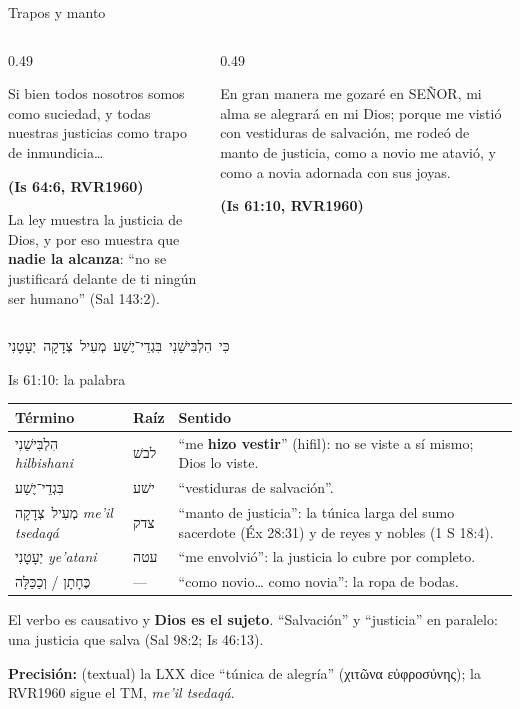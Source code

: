 \documentclass[hyperref={bookmarks=false},aspectratio=169]{beamer}
\newcommand{\heb}[1]{\mbox{\foreignlanguage{hebrew}{#1}}}
\newcommand{\grc}[1]{\foreignlanguage{ancientgreek}{#1}}
\newcommand{\SENOR}{S{\fontsize{0.78em}{1em}\selectfont EÑOR}}
\newcommand{\fuente}[1]{\par\hfill{\upshape\bfseries\footnotesize\textcolor{azul}{#1}}}
\newcommand{\destacar}[1]{\textbf{\textcolor{azul}{#1}}}
\newcommand{\precision}[1]{{\footnotesize\color{gris}\textbf{Precisión:} #1}}
\begin{document}
\begin{frame}{Trapos y manto}
\begin{columns}[t,onlytextwidth]
\begin{column}{0.49\textwidth}
\begin{cita}Si bien todos nosotros somos como suciedad, y todas nuestras justicias como trapo de inmundicia\ldots\fuente{(Is 64:6, RVR1960)}\end{cita}
\small La ley muestra la justicia de Dios, y por eso muestra que \destacar{nadie la alcanza}: ``no se justificará delante de ti ningún ser humano'' (Sal 143:2).
\end{column}
\begin{column}{0.49\textwidth}
\begin{cita}En gran manera me gozaré en \SENOR, mi alma se alegrará en mi Dios; porque me vistió con vestiduras de salvación, me rodeó de manto de justicia, como a novio me atavió, y como a novia adornada con sus joyas.\fuente{(Is 61:10, RVR1960)}\end{cita}
\end{column}
\end{columns}
\begin{center}\heb{כִּי הִלְבִּישַׁנִי בִּגְדֵי־יֶשַׁע מְעִיל צְדָקָה יְעָטָנִי}\end{center}
\end{frame}

\begin{frame}{Is 61:10: la palabra}
\scriptsize\renewcommand{\arraystretch}{1.15}
\begin{tabular}{@{}>{\RaggedRight\arraybackslash}p{2.8cm}>{\RaggedRight\arraybackslash}p{1.1cm}>{\RaggedRight\arraybackslash}p{8.0cm}@{}}
\toprule
\textbf{Término} & \textbf{Raíz} & \textbf{Sentido} \\ \midrule
\heb{הִלְבִּישַׁנִי} \emph{hilbishani} & \heb{לבשׁ} & ``me \destacar{hizo vestir}'' (hifil): no se viste a sí mismo; Dios lo viste. \\
\heb{בִּגְדֵי־יֶשַׁע} & \heb{ישׁע} & ``vestiduras de salvación''. \\
\heb{מְעִיל צְדָקָה} \emph{me'il tsedaqá} & \heb{צדק} & ``manto de justicia'': la túnica larga del sumo sacerdote (Éx 28:31) y de reyes y nobles (1 S 18:4). \\
\heb{יְעָטָנִי} \emph{ye'atani} & \heb{עטה} & ``me envolvió'': la justicia lo cubre por completo. \\
\heb{כֶּחָתָן} / \heb{וְכַכַּלָּה} & --- & ``como novio\ldots{} como novia'': la ropa de bodas. \\
\bottomrule
\end{tabular}\par\medskip
\small El verbo es causativo y \destacar{Dios es el sujeto}. ``Salvación'' y ``justicia'' en paralelo: una justicia que salva (Sal 98:2; Is 46:13).\par
\precision{(textual) la LXX dice ``túnica de alegría'' (\grc{χιτῶνα εὐφροσύνης}); la RVR1960 sigue el TM, \emph{me'il tsedaqá}.}
\end{frame}
\end{document}
